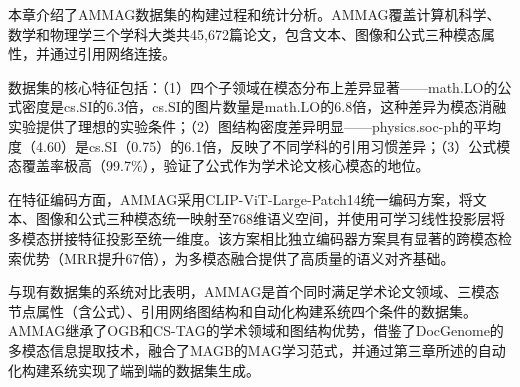 本章介绍了AMMAG数据集的构建过程和统计分析。AMMAG覆盖计算机科学、数学和物理学三个学科大类共45,672篇论文，包含文本、图像和公式三种模态属性，并通过引用网络连接。

数据集的核心特征包括：（1）四个子领域在模态分布上差异显著——math.LO的公式密度是cs.SI的6.3倍，cs.SI的图片数量是math.LO的6.8倍，这种差异为模态消融实验提供了理想的实验条件；（2）图结构密度差异明显——physics.soc-ph的平均度（4.60）是cs.SI（0.75）的6.1倍，反映了不同学科的引用习惯差异；（3）公式模态覆盖率极高（99.7\%），验证了公式作为学术论文核心模态的地位。

在特征编码方面，AMMAG采用CLIP-ViT-Large-Patch14统一编码方案，将文本、图像和公式三种模态统一映射至768维语义空间，并使用可学习线性投影层将多模态拼接特征投影至统一维度。该方案相比独立编码器方案具有显著的跨模态检索优势（MRR提升67倍），为多模态融合提供了高质量的语义对齐基础。

与现有数据集的系统对比表明，AMMAG是首个同时满足学术论文领域、三模态节点属性（含公式）、引用网络图结构和自动化构建系统四个条件的数据集。AMMAG继承了OGB\cite{hu2020ogb}和CS-TAG\cite{yan2023cstag}的学术领域和图结构优势，借鉴了DocGenome\cite{xia2024docgenome}的多模态信息提取技术，融合了MAGB\cite{yan2025magb}的MAG学习范式，并通过第三章所述的自动化构建系统实现了端到端的数据集生成。

